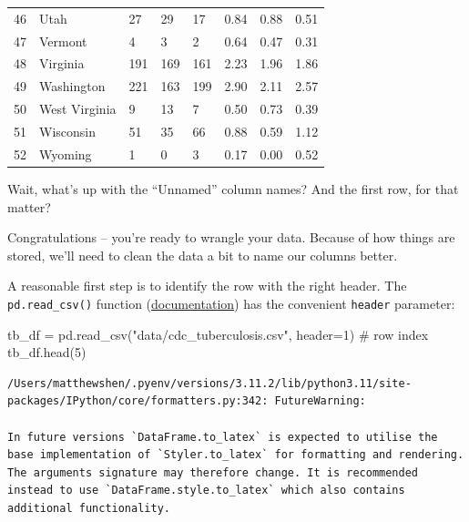 \documentclass[
  letterpaper,
  DIV=11,
  numbers=noendperiod]{scrreprt}
\newenvironment{Shaded}{\begin{snugshade}}{\end{snugshade}}
\newcommand{\CommentTok}[1]{\textcolor[rgb]{0.37,0.37,0.37}{#1}}
\newcommand{\DecValTok}[1]{\textcolor[rgb]{0.68,0.00,0.00}{#1}}
\newcommand{\NormalTok}[1]{\textcolor[rgb]{0.00,0.23,0.31}{#1}}
\newcommand{\OperatorTok}[1]{\textcolor[rgb]{0.37,0.37,0.37}{#1}}
\newcommand{\StringTok}[1]{\textcolor[rgb]{0.13,0.47,0.30}{#1}}
\begin{document}
\begin{tabular}{lllllrrr}
46 &                  Utah &              27 &         29 &         17 &          0.84 &        0.88 &        0.51 \\
47 &               Vermont &               4 &          3 &          2 &          0.64 &        0.47 &        0.31 \\
48 &              Virginia &             191 &        169 &        161 &          2.23 &        1.96 &        1.86 \\
49 &            Washington &             221 &        163 &        199 &          2.90 &        2.11 &        2.57 \\
50 &         West Virginia &               9 &         13 &          7 &          0.50 &        0.73 &        0.39 \\
51 &             Wisconsin &              51 &         35 &         66 &          0.88 &        0.59 &        1.12 \\
52 &               Wyoming &               1 &          0 &          3 &          0.17 &        0.00 &        0.52 \\
\bottomrule
\end{tabular}

Wait, what's up with the ``Unnamed'' column names? And the first row,
for that matter?

Congratulations -- you're ready to wrangle your data. Because of how
things are stored, we'll need to clean the data a bit to name our
columns better.

A reasonable first step is to identify the row with the right header.
The \texttt{pd.read\_csv()} function
(\href{https://pandas.pydata.org/docs/reference/api/pandas.read_csv.html}{documentation})
has the convenient \texttt{header} parameter:

\begin{Shaded}
\begin{Highlighting}[]
\NormalTok{tb\_df }\OperatorTok{=}\NormalTok{ pd.read\_csv(}\StringTok{"data/cdc\_tuberculosis.csv"}\NormalTok{, header}\OperatorTok{=}\DecValTok{1}\NormalTok{) }\CommentTok{\# row index}
\NormalTok{tb\_df.head(}\DecValTok{5}\NormalTok{)}
\end{Highlighting}
\end{Shaded}

\begin{verbatim}
/Users/matthewshen/.pyenv/versions/3.11.2/lib/python3.11/site-packages/IPython/core/formatters.py:342: FutureWarning:

In future versions `DataFrame.to_latex` is expected to utilise the base implementation of `Styler.to_latex` for formatting and rendering. The arguments signature may therefore change. It is recommended instead to use `DataFrame.style.to_latex` which also contains additional functionality.
\end{verbatim}
\end{document}
